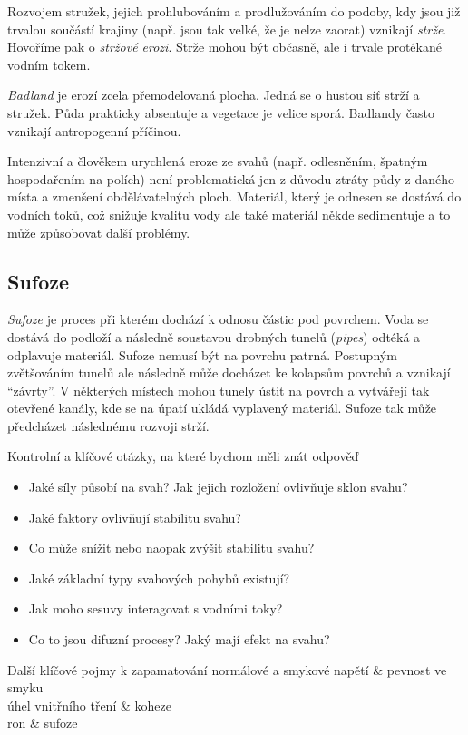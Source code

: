 Rozvojem stružek, jejich prohlubováním a prodlužováním do podoby, kdy jsou již trvalou součástí krajiny (např. jsou tak velké, že je nelze zaorat) vznikají \emph{strže}. Hovoříme pak o \emph{stržové erozi}. Strže mohou být občasně, ale i trvale protékané vodním tokem. 

\emph{Badland} je erozí zcela přemodelovaná plocha. Jedná se o hustou síť strží a stružek. Půda prakticky absentuje a vegetace je velice sporá. Badlandy často vznikají antropogenní příčinou. 

Intenzivní a člověkem urychlená eroze ze svahů (např. odlesněním, špatným hospodařením na polích) není problematická jen z důvodu ztráty půdy z daného místa a zmenšení obdělávatelných ploch. Materiál, který je odnesen se dostává do vodních toků, což snižuje kvalitu vody ale také materiál někde sedimentuje a to může způsobovat další problémy. 

\subsection{Sufoze}
\emph{Sufoze} je proces při kterém dochází k odnosu částic pod povrchem. Voda se dostává do podloží a následně soustavou drobných tunelů (\textit{pipes}) odtéká a odplavuje materiál. Sufoze nemusí být na povrchu patrná. Postupným zvětšováním tunelů ale následně může docházet ke kolapsům povrchů a vznikají \enquote{závrty}. V některých místech mohou tunely ústit na povrch a vytvářejí tak otevřené kanály, kde se na úpatí ukládá vyplavený materiál. Sufoze tak může předcházet následnému rozvoji strží. 

\newpage
\onecolumn
\begin{boxotazky}{Kontrolní a klíčové otázky, na které bychom měli znát odpověď}
	\begin{itemize}
		\item Jaké síly působí na svah? Jak jejich rozložení ovlivňuje sklon svahu?
		\item Jaké faktory ovlivňují stabilitu svahu?
		\item Co může snížit nebo naopak zvýšit stabilitu svahu?
		\item Jaké základní typy svahových pohybů existují?
		\item Jak moho sesuvy interagovat s vodními toky?
		\item Co to jsou difuzní procesy? Jaký mají efekt na svahu?
	\end{itemize}
\end{boxotazky}

\begin{boxslovnik}{Další klíčové pojmy k zapamatování}
	normálové a smykové napětí & pevnost ve smyku \\
	úhel vnitřního tření & koheze \\
	ron & sufoze \\
	
\end{boxslovnik}
\twocolumn